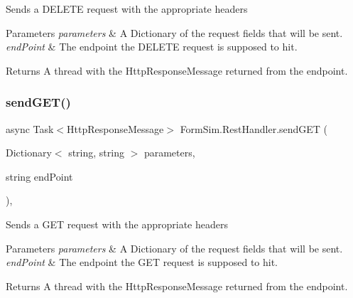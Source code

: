 Sends a D\+E\+L\+E\+TE request with the appropriate headers 


\begin{DoxyParams}{Parameters}
{\em parameters} & A Dictionary of the request fields that will be sent.\\
\hline
{\em end\+Point} & The endpoint the D\+E\+L\+E\+TE request is supposed to hit.\\
\hline
\end{DoxyParams}
\begin{DoxyReturn}{Returns}
A thread with the Http\+Response\+Message returned from the endpoint.
\end{DoxyReturn}
\mbox{\label{class_form_sim_1_1_rest_handler_adcca9a79f3a98112628190b11fd5c7ca}} 
\subsubsection{\texorpdfstring{send\+G\+E\+T()}{sendGET()}}
{\footnotesize\ttfamily async Task$<$Http\+Response\+Message$>$ Form\+Sim.\+Rest\+Handler.\+send\+G\+ET (\begin{DoxyParamCaption}\item[{Dictionary$<$ string, string $>$}]{parameters,  }\item[{string}]{end\+Point }\end{DoxyParamCaption})\hspace{0.3cm}{\ttfamily [inline]}, {\ttfamily [private]}}



Sends a G\+ET request with the appropriate headers 


\begin{DoxyParams}{Parameters}
{\em parameters} & A Dictionary of the request fields that will be sent.\\
\hline
{\em end\+Point} & The endpoint the G\+ET request is supposed to hit.\\
\hline
\end{DoxyParams}
\begin{DoxyReturn}{Returns}
A thread with the Http\+Response\+Message returned from the endpoint.
\end{DoxyReturn}
\mbox{\label{class_form_sim_1_1_rest_handler_ae69e912f1e70c08e4a9200efcb070bf8}} 
